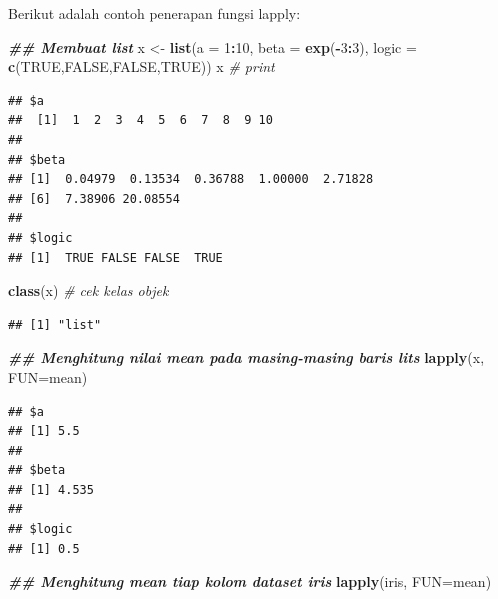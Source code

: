 \documentclass[
]{book}
\newenvironment{Shaded}{\begin{snugshade}}{\end{snugshade}}
\newcommand{\AttributeTok}[1]{\textcolor[rgb]{0.13,0.29,0.53}{#1}}
\newcommand{\CommentTok}[1]{\textcolor[rgb]{0.56,0.35,0.01}{\textit{#1}}}
\newcommand{\ConstantTok}[1]{\textcolor[rgb]{0.56,0.35,0.01}{#1}}
\newcommand{\DecValTok}[1]{\textcolor[rgb]{0.00,0.00,0.81}{#1}}
\newcommand{\DocumentationTok}[1]{\textcolor[rgb]{0.56,0.35,0.01}{\textbf{\textit{#1}}}}
\newcommand{\FunctionTok}[1]{\textcolor[rgb]{0.13,0.29,0.53}{\textbf{#1}}}
\newcommand{\NormalTok}[1]{#1}
\newcommand{\OtherTok}[1]{\textcolor[rgb]{0.56,0.35,0.01}{#1}}
\newcommand{\SpecialCharTok}[1]{\textcolor[rgb]{0.81,0.36,0.00}{\textbf{#1}}}
\theoremstyle{definition}
\theoremstyle{definition}
\theoremstyle{definition}
\theoremstyle{definition}
\theoremstyle{remark}
\begin{document}
Berikut adalah contoh penerapan fungsi lapply:

\begin{Shaded}
\begin{Highlighting}[]
\DocumentationTok{\#\# Membuat list}
\NormalTok{x }\OtherTok{\textless{}{-}} \FunctionTok{list}\NormalTok{(}\AttributeTok{a =} \DecValTok{1}\SpecialCharTok{:}\DecValTok{10}\NormalTok{, }\AttributeTok{beta =} \FunctionTok{exp}\NormalTok{(}\SpecialCharTok{{-}}\DecValTok{3}\SpecialCharTok{:}\DecValTok{3}\NormalTok{), }\AttributeTok{logic =} \FunctionTok{c}\NormalTok{(}\ConstantTok{TRUE}\NormalTok{,}\ConstantTok{FALSE}\NormalTok{,}\ConstantTok{FALSE}\NormalTok{,}\ConstantTok{TRUE}\NormalTok{))}
\NormalTok{x }\CommentTok{\# print}
\end{Highlighting}
\end{Shaded}

\begin{verbatim}
## $a
##  [1]  1  2  3  4  5  6  7  8  9 10
## 
## $beta
## [1]  0.04979  0.13534  0.36788  1.00000  2.71828
## [6]  7.38906 20.08554
## 
## $logic
## [1]  TRUE FALSE FALSE  TRUE
\end{verbatim}

\begin{Shaded}
\begin{Highlighting}[]
\FunctionTok{class}\NormalTok{(x) }\CommentTok{\# cek kelas objek}
\end{Highlighting}
\end{Shaded}

\begin{verbatim}
## [1] "list"
\end{verbatim}

\begin{Shaded}
\begin{Highlighting}[]
\DocumentationTok{\#\# Menghitung nilai mean pada masing{-}masing baris lits}
\FunctionTok{lapply}\NormalTok{(x, }\AttributeTok{FUN=}\NormalTok{mean)}
\end{Highlighting}
\end{Shaded}

\begin{verbatim}
## $a
## [1] 5.5
## 
## $beta
## [1] 4.535
## 
## $logic
## [1] 0.5
\end{verbatim}

\begin{Shaded}
\begin{Highlighting}[]
\DocumentationTok{\#\# Menghitung mean tiap kolom dataset iris}
\FunctionTok{lapply}\NormalTok{(iris, }\AttributeTok{FUN=}\NormalTok{mean)}
\end{Highlighting}
\end{Shaded}
\end{document}
